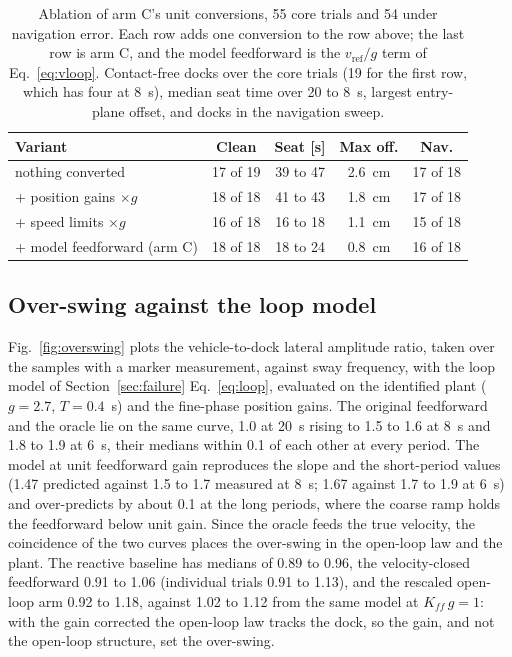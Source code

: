 \begin{table}[t]
  \caption{Ablation of arm C's unit conversions, 55 core trials and 54 under navigation error. Each row adds one conversion to the row above; the last row is arm C, and the model feedforward is the $v_{\mathrm{ref}}/g$ term of Eq.~\eqref{eq:vloop}. Contact-free docks over the core trials (19 for the first row, which has four at 8~s), median seat time over 20 to 8~s, largest entry-plane offset, and docks in the navigation sweep.}
  \label{tab:ablation}
  \centering
  \footnotesize\setlength{\tabcolsep}{2pt}
  \begin{tabular}{@{}lcccc@{}}
    \toprule
    Variant & Clean & Seat [s] & Max off. & Nav. \\
    \midrule
    nothing converted & 17 of 19 & 39 to 47 & 2.6~cm & 17 of 18 \\
    + position gains $\times g$ & 18 of 18 & 41 to 43 & 1.8~cm & 17 of 18 \\
    + speed limits $\times g$ & 16 of 18 & 16 to 18 & 1.1~cm & 15 of 18 \\
    + model feedforward (arm C) & 18 of 18 & 18 to 24 & 0.8~cm & 16 of 18 \\
    \bottomrule
  \end{tabular}
\end{table}

\subsection{Over-swing against the loop model}

Fig.~\ref{fig:overswing} plots the vehicle-to-dock lateral amplitude ratio, taken over the samples with a marker measurement, against sway frequency, with the loop model of Section~\ref{sec:failure} Eq.~\eqref{eq:loop}, evaluated on the identified plant ($g = 2.7$, $T = 0.4$~s) and the fine-phase position gains. The original feedforward and the oracle lie on the same curve, 1.0 at 20~s rising to 1.5 to 1.6 at 8~s and 1.8 to 1.9 at 6~s, their medians within 0.1 of each other at every period. The model at unit feedforward gain reproduces the slope and the short-period values (1.47 predicted against 1.5 to 1.7 measured at 8~s; 1.67 against 1.7 to 1.9 at 6~s) and over-predicts by about 0.1 at the long periods, where the coarse ramp holds the feedforward below unit gain. Since the oracle feeds the true velocity, the coincidence of the two curves places the over-swing in the open-loop law and the plant. The reactive baseline has medians of 0.89 to 0.96, the velocity-closed feedforward 0.91 to 1.06 (individual trials 0.91 to 1.13), and the rescaled open-loop arm 0.92 to 1.18, against 1.02 to 1.12 from the same model at $K_{ff}\,g = 1$: with the gain corrected the open-loop law tracks the dock, so the gain, and not the open-loop structure, set the over-swing.

